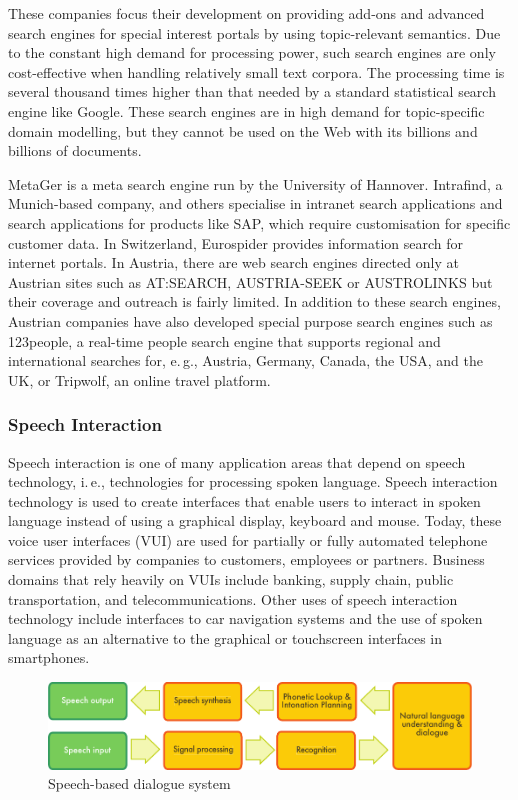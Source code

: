 \documentclass[]{../../metanetpaper}
\begin{document}
\begin{multicols}{2}
These companies focus their development on providing add-ons and advanced search engines for special interest portals by using topic-relevant semantics. Due to the constant high demand for processing power, such search engines are only cost-effective when handling relatively small text corpora. The processing time is several thousand times higher than that needed by a standard statistical search engine like Google. These search engines are in high demand for topic-specific domain modelling, but they cannot be used on the Web with its billions and billions of documents.

MetaGer is a meta search engine run by the University of Hannover. Intrafind, a Munich-based company, and others specialise in intranet search applications and search applications for products like SAP, which require customisation for specific customer data. In Switzerland, Eurospider provides information search for internet portals. In Austria, there are web search engines directed only at Austrian sites such as AT:SEARCH, AUSTRIA-SEEK or AUSTROLINKS but their coverage and outreach is fairly limited. In addition to these search engines, Austrian companies have also developed special purpose search engines such as 123people, a real-time people search engine that supports regional and international searches for, e.\,g., Austria, Germany, Canada, the USA, and the UK, or Tripwolf, an online travel platform.

\subsubsection{Speech Interaction}

Speech interaction is one of many application areas that depend on speech technology, i.\,e., technologies for processing spoken language. Speech interaction technology is used to create interfaces that enable users to interact in spoken language instead of using a graphical display, keyboard and mouse.  Today, these voice user interfaces (VUI) are used for partially or fully automated telephone services provided by companies to customers, employees or partners. Business domains that rely heavily on VUIs include banking, supply chain, public transportation, and telecommunications. Other uses of speech interaction technology include interfaces to car navigation systems and the use of spoken language as an alternative to the graphical or touchscreen interfaces in smartphones.

\begin{figure}[htb]
  \center
  \includegraphics[width=\textwidth]{../_media/english/simple_speech-based_dialogue_architecture}
  \caption{Speech-based dialogue system}
  \label{fig:dialoguearch_en}
\end{figure}


\end{multicols}
\end{document}
